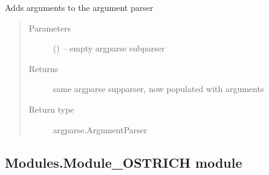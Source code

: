 \documentclass[letterpaper,10pt,english]{sphinxmanual}
\begin{document}
\begin{fulllineitems}
\label{\detokenize{MouseReferenceManual:Modules.Module_HODS.populateArgumentParser}}
Adds arguments to the argument parser
\begin{quote}\begin{description}
\item[{Parameters}] \leavevmode
{} () -- empty argparse subparser

\item[{Returns}] \leavevmode
same argparse supparser, now populated with arguments

\item[{Return type}] \leavevmode
argparse.ArgumentParser

\end{description}\end{quote}

\end{fulllineitems}



\subsection{Modules.Module\_OSTRICH module}
\label{\detokenize{MouseReferenceManual:module-Modules.Module_OSTRICH}}\label{\detokenize{MouseReferenceManual:modules-module-ostrich-module}}
\end{document}
